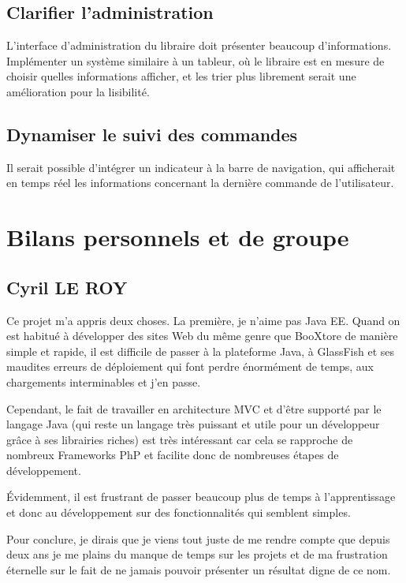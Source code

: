 	\subsection{Clarifier l'administration}

	L'interface d'administration du libraire doit présenter beaucoup d'informations. Implémenter un système similaire à un tableur, où le libraire est en mesure de choisir quelles informations afficher, et les trier plus librement serait une amélioration pour la lisibilité.

	\subsection{Dynamiser le suivi des commandes}

	Il serait possible d'intégrer un indicateur à la barre de navigation, qui afficherait en temps réel les informations concernant la dernière commande de l'utilisateur.

\section{Bilans personnels et de groupe}


\subsection{Cyril LE ROY}
Ce projet m’a appris deux choses.
La première, je n’aime pas Java EE. Quand on est habitué à développer des sites Web du même genre que BooXtore de manière simple et rapide, il est difficile de passer à la plateforme Java, à GlassFish et ses maudites erreurs de déploiement qui font perdre énormément de temps, aux chargements interminables et j’en passe.

Cependant, le fait de travailler en architecture MVC et d’être supporté par le langage Java (qui reste un langage très puissant et utile pour un développeur grâce à ses librairies riches) est très intéressant car cela se rapproche de nombreux Frameworks PhP et facilite donc de nombreuses étapes de développement.

Évidemment, il est frustrant de passer beaucoup plus de temps à l’apprentissage et donc au développement sur des fonctionnalités qui semblent simples.

Pour conclure, je dirais que je viens tout juste de me rendre compte que depuis deux ans je me plains du manque de temps sur les projets et de ma frustration éternelle sur le fait de ne jamais pouvoir présenter un résultat digne de ce nom.


